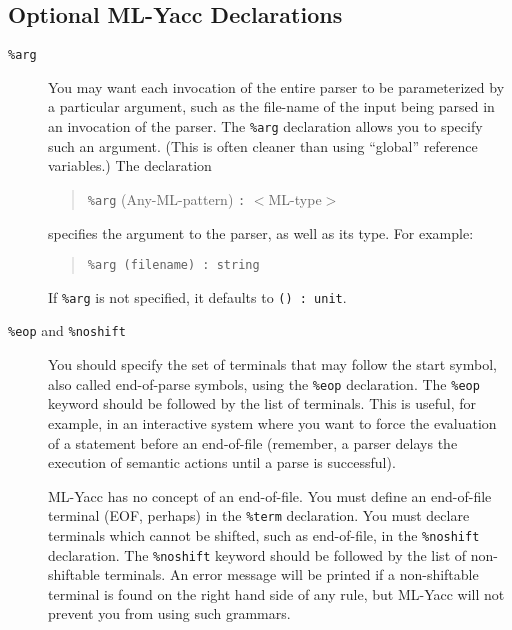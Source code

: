 \subsection{Optional ML-Yacc Declarations}
\label{optional-def}
\begin{description}
\item[{\tt \%arg}]
You may want each invocation of the entire parser to be parameterized
by a particular argument, such as the file-name of the input
being parsed in an invocation of the parser.  The {\tt \%arg} declaration
allows you to specify such an argument.
(This is often cleaner than using ``global'' reference variables.)
The declaration
\begin{quote}

        {\tt \%arg} (Any-ML-pattern) {\tt :} $<$ML-type$>$

\end{quote}
specifies the argument to the parser, as well as its type.  For example:
\begin{quote}

        {\tt \%arg (filename) : string}

\end{quote}

If {\tt \%arg} is not specified, it defaults to {\tt () : unit}.
\item[{\tt \%eop} and {\tt \%noshift}]
You should specify the set of
terminals that may follow the start
symbol, also called end-of-parse symbols, using the {\tt \%eop}
declaration.  The {\tt \%eop} keyword should be followed by the list of
terminals.  This is useful, for example, in an interactive system
where you want to force the evaluation of a statement before an
end-of-file (remember, a parser delays the execution of semantic
actions until a parse is successful).

ML-Yacc has no concept of an end-of-file.  You must
define an end-of-file terminal (EOF, perhaps) in the 
{\tt \%term} declaration.
You must declare terminals which cannot be shifted, such as 
end-of-file, in the {\tt \%noshift} declaration.  The
{\tt \%noshift} keyword should be followed by the list of non-shiftable
terminals. An error message will be printed if a non-shiftable terminal
is found on the right hand side of any rule, but ML-Yacc will not prevent
you from using such grammars.


\end{description}
